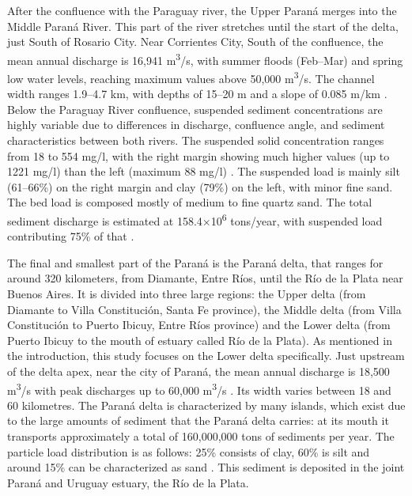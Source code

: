 After the confluence with the Paraguay river, the Upper Paraná merges into the Middle Paraná River. This part of the river stretches until the start of the delta, just South of Rosario City. Near Corrientes City, South of the confluence, the mean annual discharge is 16,941 m\textsuperscript{3}/s, with summer floods (Feb–Mar) and spring low water levels, reaching maximum values above 50,000 m\textsuperscript{3}/s. The channel width ranges 1.9–4.7 km, with depths of 15–20 m and a slope of 0.085 m/km \autocite{orfeoHydraulicMorphologicalCharacteristics2002}. Below the Paraguay River confluence, suspended sediment concentrations are highly variable due to differences in discharge, confluence angle, and sediment characteristics between both rivers. The suspended solid concentration ranges from 18 to 554 mg/l, with the right margin showing much higher values (up to 1221 mg/l) than the left (maximum 88 mg/l)  \autocite{depetrisSuspendedLoadRio1968}. The suspended load is mainly silt (61–66\%) on the right margin and clay (79\%) on the left, with minor fine sand. The bed load is composed mostly of medium to fine quartz sand. The total sediment discharge is estimated at 158.4×10\textsuperscript{6} tons/year, with suspended load contributing 75\% of that \autocite{orfeoHydraulicMorphologicalCharacteristics2002}.

The final and smallest part of the Paraná is the Paraná delta, that ranges for around 320 kilometers, from Diamante, Entre Ríos, until the Río de la Plata near Buenos Aires. It is divided into three large regions: the Upper delta (from Diamante to Villa Constitución, Santa Fe province), the Middle delta (from Villa Constitución to Puerto Ibicuy, Entre Ríos province) and the Lower delta (from Puerto Ibicuy to the mouth of estuary called Río de la Plata). As mentioned in the introduction, this study focuses on the Lower delta specifically. Just upstream of the delta apex, near the city of Paraná, the mean annual discharge is 18,500 m\textsuperscript{3}/s with peak discharges up to 60,000 m\textsuperscript{3}/s \autocite{westerHydrodynamicModellingTidal2018}. Its width varies between 18 and 60 kilometres. The Paraná delta is characterized by many islands, which exist due to the large amounts of sediment that the Paraná delta carries: at its mouth it transports approximately a total of 160,000,000 tons of sediments per year. The particle load distribution is as follows: 25\% consists of clay, 60\% is silt and around 15\% can be characterized as sand \autocite{academialabParanaDelta}. This sediment is deposited in the joint Paraná and Uruguay estuary, the Río de la Plata.


